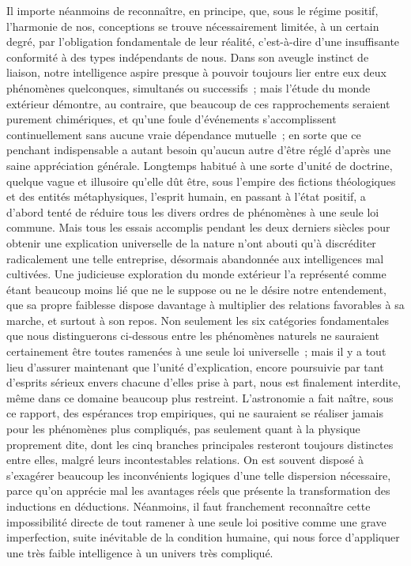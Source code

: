 \documentclass[french,twoside]{book} %
\begin{document}
Il importe néanmoins de reconnaître, en principe, que, sous le régime positif, l’harmonie de nos, conceptions se trouve nécessairement limitée, à un certain degré, par l’obligation fondamentale de leur réalité, c’est-à-dire d’une insuffisante conformité à des types indépendants de nous. Dans son aveugle instinct de liaison, notre intelligence aspire presque à pouvoir toujours lier entre eux deux phénomènes quelconques, simultanés ou successifs ; mais l’étude du monde extérieur démontre, au contraire, que beaucoup de ces rapprochements seraient purement chimériques, et qu’une foule d’événements s’accomplissent continuellement sans aucune vraie dépendance mutuelle ; en sorte que ce penchant indispensable a autant besoin qu’aucun autre d’être réglé d’après une saine appréciation générale. Longtemps habitué à une sorte d’unité de doctrine, quelque vague et illusoire qu’elle dût être, sous l’empire des fictions théologiques et des entités métaphysiques, l’esprit humain, en passant à l’état positif, a d’abord tenté de réduire tous les divers ordres de phénomènes à une seule loi commune. Mais tous les essais accomplis pendant les deux derniers siècles pour obtenir une explication universelle de la nature n’ont abouti qu’à discréditer radicalement une telle entreprise, désormais abandonnée aux intelligences mal cultivées. Une judicieuse exploration du monde extérieur l’a représenté comme étant beaucoup moins lié que ne le suppose ou ne le désire notre entendement, que sa propre faiblesse dispose davantage à multiplier des relations favorables à sa marche, et surtout à son repos. Non seulement les six catégories fondamentales que nous distinguerons ci-dessous entre les phénomènes naturels ne sauraient certainement être toutes ramenées à une seule loi universelle ; mais il y a tout lieu d’assurer maintenant que l’unité d’explication, encore poursuivie par tant d’esprits sérieux envers chacune d’elles prise à part, nous est finalement interdite, même dans ce domaine beaucoup plus restreint. L’astronomie a fait naître, sous ce rapport, des espérances trop empiriques, qui ne sauraient se réaliser jamais pour les phénomènes plus compliqués, pas seulement quant à la physique proprement dite, dont les cinq branches principales resteront toujours distinctes entre elles, malgré leurs incontestables relations. On est souvent disposé à s’exagérer beaucoup les inconvénients logiques d’une telle dispersion nécessaire, parce qu’on apprécie mal les avantages réels que présente la transformation des inductions en déductions. Néanmoins, il faut franchement reconnaître cette impossibilité directe de tout ramener à une seule loi positive comme une grave imperfection, suite inévitable de la condition humaine, qui nous force d’appliquer une très faible intelligence à un univers très compliqué.\par
\end{document}
